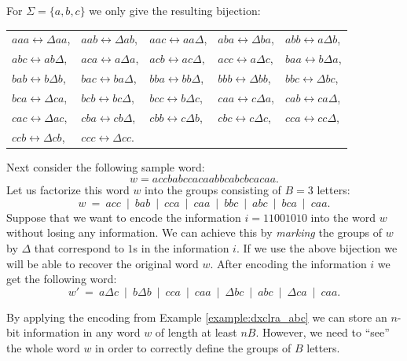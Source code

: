 \begin{example}\label{example:dxclra_abc}
For $\Sigma = \{a, b, c\}$ we only give the resulting bijection:
\begin{center}
\begin{tabular}{lllll}
  $aaa \leftrightarrow \Delta a a$,\quad\quad
& $aab \leftrightarrow \Delta a b$,\quad\quad
& $aac \leftrightarrow a a \Delta$,\quad\quad
& $aba \leftrightarrow \Delta b a$,\quad\quad
& $abb \leftrightarrow a \Delta b$,\\
  $abc \leftrightarrow a b \Delta$,
& $aca \leftrightarrow a \Delta a$,
& $acb \leftrightarrow a c \Delta$,
& $acc \leftrightarrow a \Delta c$,
& $baa \leftrightarrow b \Delta a$,\\
  $bab \leftrightarrow b \Delta b$,
& $bac \leftrightarrow b a \Delta$,
& $bba \leftrightarrow b b \Delta$,
& $bbb \leftrightarrow \Delta b b$,
& $bbc \leftrightarrow \Delta b c$,\\
  $bca \leftrightarrow \Delta c a$,
& $bcb \leftrightarrow b c \Delta$,
& $bcc \leftrightarrow b \Delta c$,
& $caa \leftrightarrow c \Delta a$,
& $cab \leftrightarrow c a \Delta$,\\
  $cac \leftrightarrow \Delta a c$,
& $cba \leftrightarrow c b \Delta$,
& $cbb \leftrightarrow c \Delta b$,
& $cbc \leftrightarrow c \Delta c$,
& $cca \leftrightarrow c c \Delta$,\\
  $ccb \leftrightarrow \Delta c b$,
& $ccc \leftrightarrow \Delta c c$.
\end{tabular}
\end{center}

Next consider the following sample word:
$$w = acc bab cca caa bbc abc bca caa.$$
Let us factorize this word $w$ into the groups consisting of $B = 3$ letters:
$$w\ =\ acc\ \mid\ bab\ \mid\ cca\ \mid\ caa\ \mid\ bbc\ \mid\ abc\ \mid\ bca\ \mid\ caa.$$
Suppose that we want to encode the information $i = 11001010$ into the word $w$ without losing any information. We can achieve this by \emph{marking} the groups of $w$ by $\Delta$ that correspond to $1$s in the information $i$. If we use the above bijection we will be able to recover the original word $w$. After encoding the information $i$ we get the following word:
$$w'\ =\ a \Delta c\ \mid\ b \Delta b\ \mid\ c c a\ \mid\ c a a\ \mid
       \ \Delta b c\ \mid\ a b c\ \mid\ \Delta c a\ \mid\ c a a.$$
\end{example}

By applying the encoding from Example \ref{example:dxclra_abc} we can store an $n$-bit information in any word $w$ of length at least $n B$. However, we need to ``see'' the whole word $w$ in order to correctly define the groups of $B$ letters.

